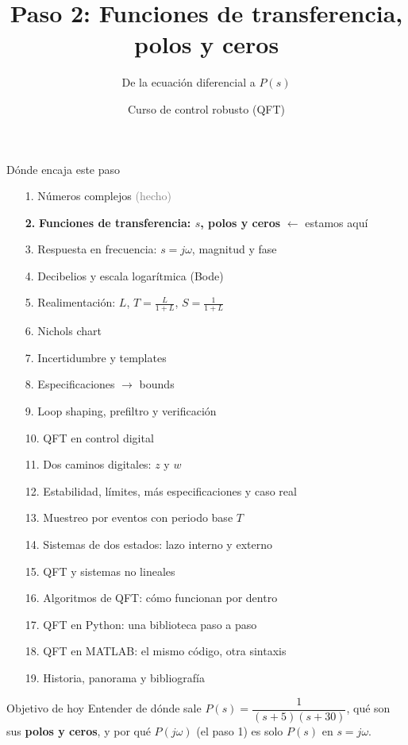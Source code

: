 \documentclass[aspectratio=169,11pt]{beamer}
\title[Funciones de transferencia]{Paso 2: Funciones de transferencia, polos y ceros}
\subtitle{De la ecuación diferencial a $P(s)$}
\author{Curso de control robusto (QFT)}
\date{}
\begin{document}
\begin{frame}
  \titlepage
\end{frame}

\begin{frame}{Dónde encaja este paso}
  \tiny
  \begin{enumerate}\setlength{\itemsep}{-2pt}
    \item[1.] Números complejos \hfill \textcolor{gray}{(hecho)}
    \item[\textbf{2.}] \textbf{Funciones de transferencia: $s$, polos y ceros} \hfill $\leftarrow$ estamos aquí
    \item[3.] Respuesta en frecuencia: $s=j\omega$, magnitud y fase
    \item[4.] Decibelios y escala logarítmica (Bode)
    \item[5.] Realimentación: $L$, $T=\frac{L}{1+L}$, $S=\frac{1}{1+L}$
    \item[6.] Nichols chart
    \item[7.] Incertidumbre y templates
    \item[8.] Especificaciones $\rightarrow$ bounds
    \item[9.] Loop shaping, prefiltro y verificación
    \item[10.] QFT en control digital
    \item[11.] Dos caminos digitales: $z$ y $w$
    \item[12.] Estabilidad, límites, más especificaciones y caso real
    \item[13.] Muestreo por eventos con periodo base $T$
    \item[14.] Sistemas de dos estados: lazo interno y externo
    \item[15.] QFT y sistemas no lineales
    \item[16.] Algoritmos de QFT: cómo funcionan por dentro
    \item[17.] QFT en Python: una biblioteca paso a paso
    \item[18.] QFT en MATLAB: el mismo código, otra sintaxis
    \item[19.] Historia, panorama y bibliografía
  \end{enumerate}
  \vspace{0pt}
  \begin{block}{Objetivo de hoy}
    Entender de dónde sale $P(s)=\dfrac{1}{(s+5)(s+30)}$, qué son sus \textbf{polos y ceros}, y por qué $P(j\omega)$ (el paso 1) es solo $P(s)$ en $s=j\omega$.
  \end{block}
\end{frame}
\end{document}
